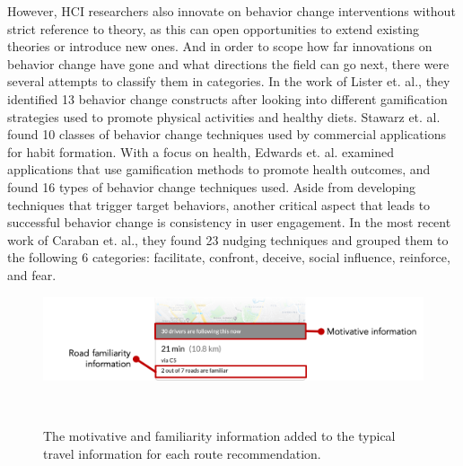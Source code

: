 However, HCI researchers also innovate on behavior change interventions without strict reference to theory, as this can open opportunities to extend existing theories or introduce new ones. And in order to scope how far innovations on behavior change have gone and what directions the field can go next, there were several attempts to classify them in categories. In the work of Lister et. al., they identified 13 behavior change constructs after looking into different gamification strategies used to promote physical activities and healthy diets\cite{lister2014just}. Stawarz et. al. found 10 classes of behavior change techniques used by commercial applications for habit formation\cite{stawarz2014don}. With a focus on health, Edwards et. al. examined applications that use gamification methods to promote health outcomes, and found 16 types of behavior change techniques used\cite{edwards2016gamification}. Aside from developing techniques that trigger target behaviors, another critical aspect that leads to successful behavior change is consistency in user engagement. In the most recent work of Caraban et. al., they found 23 nudging techniques and grouped them to the following 6 categories: facilitate, confront, deceive, social influence, reinforce, and fear\cite{caraban201923}. 

\begin{figure}[t]
\centering
  \includegraphics[scale=0.8]{figures/s3-navi-parts.png}
  \caption{The motivative and familiarity information added to the typical travel information for each route recommendation.}~\label{fig:s3-new-info}
\end{figure}

